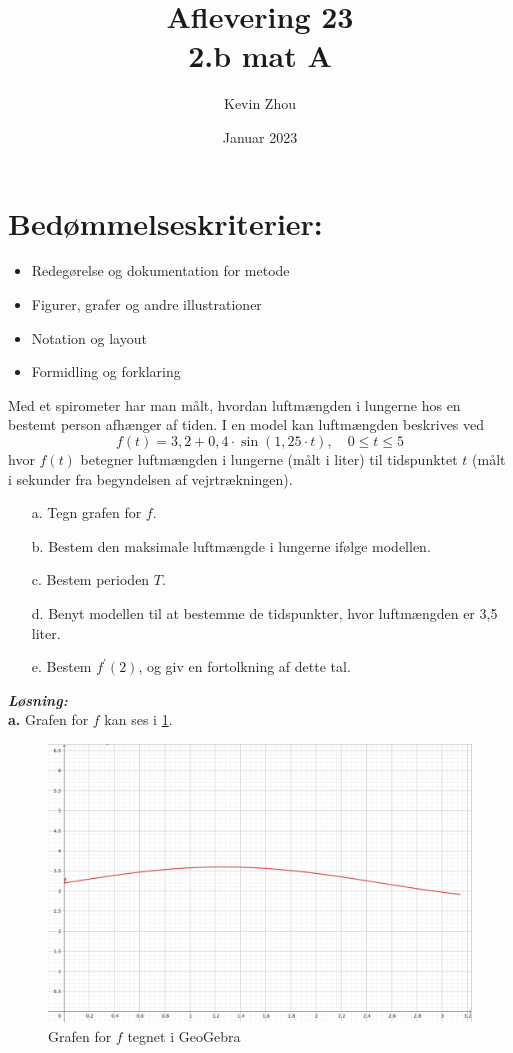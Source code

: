 \documentclass{article}
\title{Aflevering 23\\
{\Large \textbf{2.b mat A}}}
\author{Kevin Zhou}
\date{Januar 2023}
\newcommand{\sol}{\setlength{\parindent}{0cm}\textbf{\textit{Løsning:}}\setlength{\parindent}{1cm}}
\begin{document}
\maketitle
\section*{Bedømmelseskriterier:}
\begin{itemize}
    \setlength\itemsep{3cm}
    \Large
    \item  Redegørelse og dokumentation for metode
    \item Figurer, grafer og andre illustrationer
    \item Notation og layout
    \item Formidling og forklaring
\end{itemize}
\pagebreak
\begin{question}{}{}
  Med et spirometer har man målt, hvordan luftmængden i lungerne hos en bestemt person afhænger af tiden. I en model kan luftmængden beskrives ved
$$
f(t)=3,2+0,4 \cdot \sin (1,25 \cdot t), \quad 0 \leq t \leq 5
$$
hvor $f(t)$ betegner luftmængden i lungerne (målt i liter) til tidspunktet $t$ (målt i sekunder fra begyndelsen af vejrtrækningen).
\begin{itemize}
  \item[a.] Tegn grafen for $f$.
  \item[b.] Bestem den maksimale luftmængde i lungerne ifølge modellen.
  \item[c.] Bestem perioden $T$.
  \item[d.] Benyt modellen til at bestemme de tidspunkter, hvor luftmængden er 3,5 liter.
  \item[e.] Bestem $f^{\prime}(2)$, og giv en fortolkning af dette tal.
\end{itemize}
\end{question}
\sol \\ 
\textbf{a.} 
Grafen for $f$ kan ses i \cref{fig:lunger}. 
\begin{figure}[H]
\begin{center}
  \includegraphics[width=\textwidth]{lunge.png}
\end{center}
\caption{Grafen for $f$ tegnet i GeoGebra }
\label{fig:lunger}
\end{figure}
\end{document}
